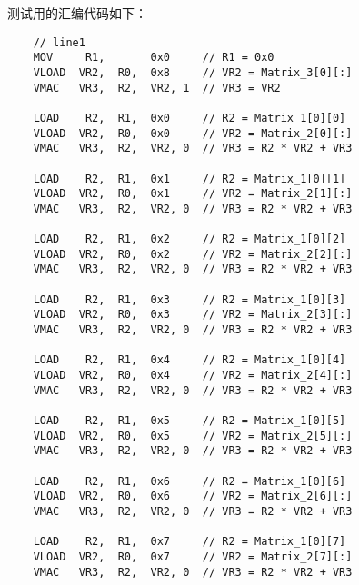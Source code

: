 \documentclass[UTF8]{ctexart}
\begin{document}
测试用的汇编代码如下：
\begin{lstlisting}
    // line1
    MOV     R1,       0x0     // R1 = 0x0
    VLOAD  VR2,  R0,  0x8     // VR2 = Matrix_3[0][:]
    VMAC   VR3,  R2,  VR2, 1  // VR3 = VR2

    LOAD    R2,  R1,  0x0     // R2 = Matrix_1[0][0]
    VLOAD  VR2,  R0,  0x0     // VR2 = Matrix_2[0][:]
    VMAC   VR3,  R2,  VR2, 0  // VR3 = R2 * VR2 + VR3

    LOAD    R2,  R1,  0x1     // R2 = Matrix_1[0][1]
    VLOAD  VR2,  R0,  0x1     // VR2 = Matrix_2[1][:]
    VMAC   VR3,  R2,  VR2, 0  // VR3 = R2 * VR2 + VR3

    LOAD    R2,  R1,  0x2     // R2 = Matrix_1[0][2]
    VLOAD  VR2,  R0,  0x2     // VR2 = Matrix_2[2][:]
    VMAC   VR3,  R2,  VR2, 0  // VR3 = R2 * VR2 + VR3

    LOAD    R2,  R1,  0x3     // R2 = Matrix_1[0][3]
    VLOAD  VR2,  R0,  0x3     // VR2 = Matrix_2[3][:]
    VMAC   VR3,  R2,  VR2, 0  // VR3 = R2 * VR2 + VR3

    LOAD    R2,  R1,  0x4     // R2 = Matrix_1[0][4]
    VLOAD  VR2,  R0,  0x4     // VR2 = Matrix_2[4][:]
    VMAC   VR3,  R2,  VR2, 0  // VR3 = R2 * VR2 + VR3

    LOAD    R2,  R1,  0x5     // R2 = Matrix_1[0][5]
    VLOAD  VR2,  R0,  0x5     // VR2 = Matrix_2[5][:]
    VMAC   VR3,  R2,  VR2, 0  // VR3 = R2 * VR2 + VR3

    LOAD    R2,  R1,  0x6     // R2 = Matrix_1[0][6]
    VLOAD  VR2,  R0,  0x6     // VR2 = Matrix_2[6][:]
    VMAC   VR3,  R2,  VR2, 0  // VR3 = R2 * VR2 + VR3

    LOAD    R2,  R1,  0x7     // R2 = Matrix_1[0][7]
    VLOAD  VR2,  R0,  0x7     // VR2 = Matrix_2[7][:]
    VMAC   VR3,  R2,  VR2, 0  // VR3 = R2 * VR2 + VR3


\end{lstlisting}
\end{document}
